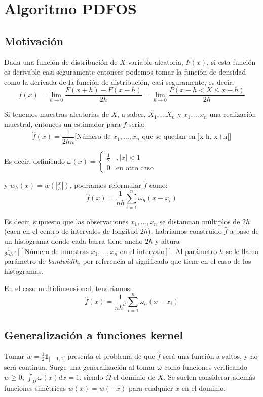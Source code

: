 \section{Algoritmo PDFOS}
\subsection{Motivación}
Dada una función de distribución de $X$ variable aleatoria, $F(x)$, si esta función es derivable casi seguramente entonces
podemos tomar la función de densidad como la derivada de la función de distribución, casi seguramente, es decir:
\[
  f(x) = \lim_{h\rightarrow 0} \frac{F(x+h) - F(x-h)}{2h} = \lim_{h\rightarrow 0} \frac{P(x-h < X \le x+h)}{2h}
\]

Si tenemos muestras aleatorias de $X$, a saber, $X_1, \ldots X_n$ y $x_1, \ldots x_n$ una realización muestral, entonces un 
estimador para $f$ sería:
\[
  \widehat{f}(x) = \frac{1}{2hn} \bigg[\textrm{Número de } x_1, \ldots, x_n \textrm{ que se quedan en ]x-h, x+h[}\bigg]
\]

Es decir, definiendo $\omega(x) = \left\{\begin{array}{ll} 
                                \frac{1}{2} &, |x| < 1\\
                                0 & \textrm{en otro caso}
                                \end{array}\right.$
                                
                                
y $w_h(x) = w\left(\left|\frac{x}{h}\right|\right)$, podríamos reformular $\widehat{f}$ como:
\[
  \widehat{f}(x) = \frac{1}{nh} \sum_{i=1}^n \omega_h(x-x_i)
\]

Es decir, supuesto que las observaciones $x_1, \ldots, x_n$ se distancian múltiplos de $2h$ (caen en el centro de intervalos
de longitud $2h$), habríamos construido $\widehat{f}$ a base de un histograma donde cada barra tiene ancho $2h$ y altura 
$\frac{1}{2nh} \cdot \bigg[[\textrm{Número de muestras } x_1, \ldots, x_n \textrm{ en el intervalo}]\bigg]$. Al parámetro $h$
se le llama parámetro de \textit{bandwidth}, por referencia al significado que tiene en el caso de los histogramas.

En el caso multidimensional, tendríamos:
\[
  \widehat{f}(x) = \frac{1}{nh^d} \sum_{i=1}^n \omega_h(x-x_i)
\]

\subsection{Generalización a funciones kernel}
Tomar $w = \frac{1}{2} \mathds{1}_{]-1,1[}$ presenta el problema de que $\widehat{f}$ será una función a saltos, y no
será continua. Surge una generalización al tomar $\omega$ como funciones verificando $w\ge 0$, $\int_{\Omega} \omega(x) dx = 1$, 
siendo $\Omega$ el dominio de $X$. Se suelen considerar además funciones simétricas $w(x) = w(-x)$ para cualquier 
$x$ en el dominio.


